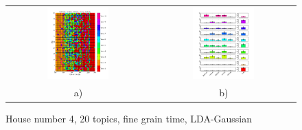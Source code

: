 \begin{figure}[h!]
 \centering
 \begin{tabular}{c c}
  \includegraphics[width=0.45\textwidth]{Pictures/Gaus/fine/DayHN4TS48k20fine.png}
  &
  \includegraphics[width=0.45\textwidth]{Pictures/Gaus/fine/TopHN4TS48k20fine.png}\\
  a) & b)
 \end{tabular}
  \caption{House number 4, 20 topics, fine grain time, LDA-Gaussian}
\end{figure}

